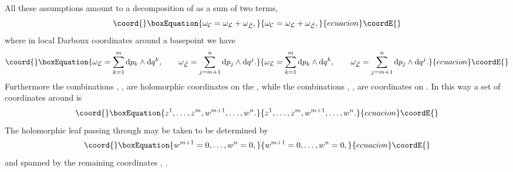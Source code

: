 \documentclass[a4paper,a4paper]{article}
\begin{document}
All these assumptions amount to a decomposition of \coordHE{}
as a sum of two terms,  
\begin{equation}\coord{}\boxEquation{
\omega_{\cal C}=\omega_{\cal L} + \omega_{\tilde {\cal L}},
\label{twot}
}{
\omega_{\cal C}=\omega_{\cal L} + \omega_{\tilde {\cal L}},
}{ecuacion}\coordE{}\end{equation}
where in local Darboux coordinates around a basepoint \coordHE{} we have
\begin{equation}\coord{}\boxEquation{
\omega_{\cal L}=
\sum_{k=1}^{m} {\rm d}p_k\wedge {\rm d}q^k, \qquad 
\omega_{\tilde {\cal L}}=
\sum_{j=m+1}^{n} {\rm d}p_j\wedge {\rm d}q^j.
\label{twoterms}
}{
\omega_{\cal L}=
\sum_{k=1}^{m} {\rm d}p_k\wedge {\rm d}q^k, \qquad 
\omega_{\tilde {\cal L}}=
\sum_{j=m+1}^{n} {\rm d}p_j\wedge {\rm d}q^j.
}{ecuacion}\coordE{}\end{equation}
Furthermore the combinations \coordHE{}, \coordHE{}, 
are holomorphic coordinates on the \coordHE{}, while the combinations 
\coordHE{}, \coordHE{}, are coordinates on \coordHE{}. 
In this way a set of coordinates around \coordHE{} is
\begin{equation}\coord{}\boxEquation{
z^1, \ldots, z^{m}, w^{m+1}, \ldots, w^n.
\label{quacoords}
}{
z^1, \ldots, z^{m}, w^{m+1}, \ldots, w^n.
}{ecuacion}\coordE{}\end{equation}
The holomorphic leaf \coordHE{} passing through \coordHE{} may be taken to be
determined by
\begin{equation}\coord{}\boxEquation{
w^{m+1}=0,\ldots, w^n = 0,
\label{pass}
}{
w^{m+1}=0,\ldots, w^n = 0,
}{ecuacion}\coordE{}\end{equation}
and spanned by the remaining coordinates \coordHE{}, \coordHE{}.
\end{document}
